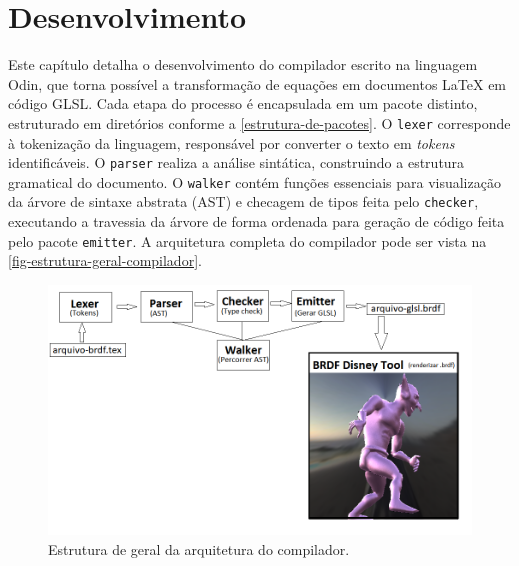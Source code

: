
\chapter{Desenvolvimento} \label{chapter-dev}

Este capítulo detalha o desenvolvimento do compilador escrito na linguagem Odin, que torna possível a transformação de equações em documentos \LaTeX{} em código GLSL. Cada etapa do processo é encapsulada em um pacote distinto, estruturado em diretórios conforme a \autoref{estrutura-de-pacotes}. O \texttt{lexer} corresponde à tokenização da linguagem, responsável por converter o texto em \textit{tokens} identificáveis. O \texttt{parser} realiza a análise sintática, construindo a estrutura gramatical do documento. O \texttt{walker} contém funções essenciais para visualização da árvore de sintaxe abstrata (AST) e checagem de tipos feita pelo \texttt{checker}, executando a travessia da árvore de forma ordenada para geração de código feita pelo pacote \texttt{emitter}. A arquitetura completa do compilador pode ser vista na \autoref{fig-estrutura-geral-compilador}.

\begin{figure}[!ht]
  \caption{\label{fig-estrutura-geral-compilador} \small Estrutura de geral da arquitetura do compilador.}
  \begin{center}
    \includegraphics[scale=0.62]{./Imagens/estutura-geral-do-projeto.png}
  \end{center}
\end{figure}


